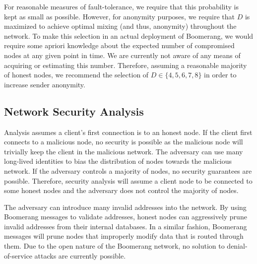 For reasonable measures of fault-tolerance, we require that this probability is kept as small as possible. However, for anonymity purposes, we require that $D$ is maximized to achieve optimal mixing (and thus, anonymity) throughout the network. To make this selection in an actual deployment of Boomerang, we would require some apriori knowledge about the expected number of compromised nodes at any given point in time. We are currently not aware of any means of acquiring or estimating this number. Therefore, assuming a reasonable majority of honest nodes, we recommend the selection of $D \in \{4, 5, 6, 7, 8\}$ in order to increase sender anonymity. 

\subsection{Network Security Analysis}
Analysis assumes a client’s first connection is to an honest node. If the client first connects to a malicious node, no security is possible as the malicious node will trivially keep the client in the malicious network. The adversary can use many long-lived identities to bias the distribution of nodes towards the malicious network. If the adversary controls a majority of nodes, no security guarantees are possible.  Therefore, security analysis will assume a client node to be connected to some honest nodes and the adversary does not control the majority of nodes.

The adversary can introduce many invalid addresses into the network. By using Boomerang messages to validate addresses, honest nodes can aggressively prune invalid addresses from their internal databases. In a similar fashion, Boomerang messages will prune nodes that improperly modify data that is routed through them. Due to the open nature of the Boomerang network, no solution to denial-of-service attacks are currently possible.

